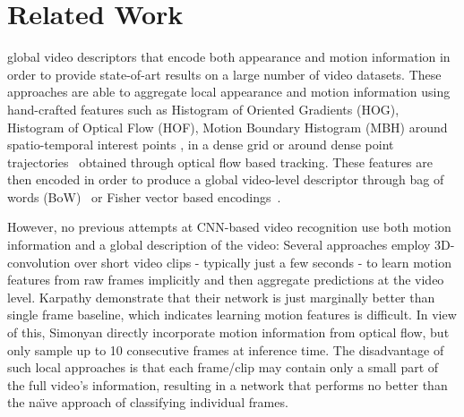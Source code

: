 \documentclass[10pt,twocolumn,letterpaper]{article}
\begin{document}
\vspace{-.8em}\section{Related Work}\vspace{-1em}\label{sec:related}%
global video descriptors that encode both appearance and motion information in order to
 provide state-of-art results on a large number of video datasets. These approaches are able
to aggregate local appearance and motion information using hand-crafted features
such as Histogram of Oriented Gradients (HOG), Histogram of Optical
Flow (HOF), Motion Boundary Histogram (MBH) around spatio-temporal
interest points \cite{laptev-actions}, in a dense grid
\cite{Wang09evaluationof} or around dense point
trajectories~\cite{jain13,kuehne11,wang11,wang13} obtained through
optical flow based tracking. These features are then encoded in order
to produce a global video-level descriptor through bag of words
(BoW)~\cite{laptev-actions} or Fisher vector based
encodings~\cite{wang13}.

However, no previous attempts at CNN-based video recognition use both
motion information and a global description of the video: Several
approaches \cite{liris2011,ji2013,karpathy2014large} employ
3D-convolution over short video clips - typically just a few seconds -
to learn motion features from raw frames implicitly
and then aggregate predictions at the video level.
Karpathy \etal\cite{karpathy2014large} demonstrate that their network
is just marginally better than single frame baseline, which indicates
learning motion features is difficult.
In view of this, Simonyan
\etal\cite{simonyan2014two} directly incorporate motion information
from optical flow, but only sample up to 10 consecutive frames at
inference time. The disadvantage of such local approaches is that each
frame/clip may contain only a small part of the full video's
information, resulting in a network that performs no better than the
na\"{\i}ve approach of classifying individual frames.
\end{document}
